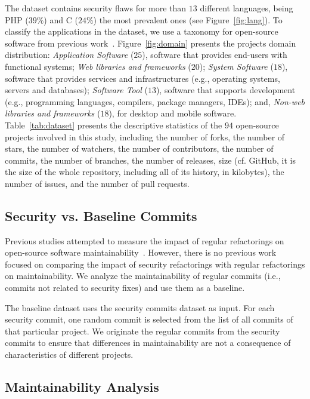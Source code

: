 \documentclass[10pt,conference]{IEEEtran}
\begin{document}
The dataset contains security flaws for more than $13$ different languages,
being PHP ($39\%$) and C ($24\%$) the most prevalent ones (see Figure~\ref{fig:lang}).
To classify the applications in the dataset, we use a taxonomy for open-source
software from previous work~\cite{7816479}. Figure~\ref{fig:domain}
presents the projects domain distribution: \textit{Application Software} ($25$),
software that provides end-users with functional systems; \textit{Web libraries
and frameworks} ($20$); \textit{System Software} ($18$), software that provides
services and infrastructures (e.g., operating systems, servers and databases);
\textit{Software Tool} ($13$), software that supports development (e.g.,
programming languages, compilers, package managers, IDEs); and, \textit{Non-web
libraries and frameworks} ($18$), for desktop and mobile software.
%
Table~\ref{tab:dataset} presents the descriptive statistics of the $94$
open-source projects involved in this study, including the number of forks, the
number of stars, the number of watchers, the number of contributors, the number
of commits, the number of branches, the number of releases,  size (cf. GitHub, it
is the size of the whole repository, including all of its history, in
kilobytes), the number of issues, and the number of pull requests.


%
\subsection{Security vs. Baseline Commits}
%
Previous studies attempted to measure the impact of regular refactorings on
open-source software maintainability~\cite{HEGEDUS2018313}. However, there is no
previous work focused on comparing the impact of security refactorings with
regular refactorings on maintainability. We analyze the maintainability of
regular commits (i.e., commits not related to security fixes) and use them as a
baseline.

The baseline dataset uses the security commits dataset as input. For each
security commit, one random commit is selected from the list of all commits of
that particular project. We originate the regular commits from the security
commits to ensure that differences in maintainability are not a consequence of
characteristics of different projects.
%
\subsection{Maintainability Analysis}
\end{document}
